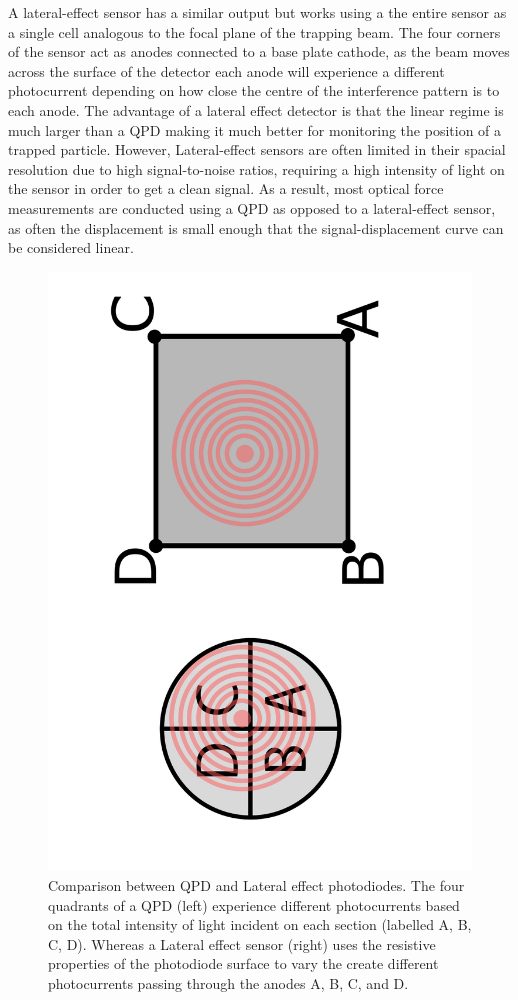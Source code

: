 A lateral-effect sensor has a similar output but works using a the 
entire sensor as a single cell analogous to the focal plane of the 
trapping beam. The four corners of the sensor act as anodes connected 
to a base plate cathode, as the beam moves across the surface of the 
detector each anode will experience a different photocurrent depending 
on how close the centre of the interference pattern is to each anode. 
The advantage of a lateral effect detector is that the linear regime 
is much larger than a QPD making it much better for monitoring the 
position of a trapped particle. However, Lateral-effect sensors are 
often limited in their spacial resolution due to high signal-to-noise 
ratios, requiring a high intensity of light on the sensor in order to 
get a clean signal. As a result, most optical force measurements are 
conducted using a QPD as opposed to a lateral-effect sensor, as often 
the displacement is small enough that the signal-displacement curve 
can be considered linear.
\begin{figure}[h!]
	\centering
	\includegraphics[height=\linewidth, angle=270]{QPD_Lateral_effect.pdf}
	\caption{Comparison between QPD and Lateral effect photodiodes.
	The four quadrants of a QPD (left) experience different photocurrents
	based on the total intensity of light incident on each section 
	(labelled A, B, C, D). 
	Whereas a Lateral effect sensor (right) uses the resistive properties
	of the photodiode surface to vary the create different photocurrents 
	passing through the anodes A, B, C, and D.}
\end{figure}

